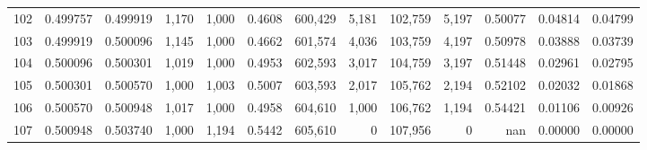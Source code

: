 \begin{tabular}{rrrrrrrrrrrrr}
102 &  0.499757 &  0.499919 &   1,170 &  1,000 &                                     0.4608 &  600,429 &    5,181 &  102,759 &    5,197 &  0.50077 &  0.04814 &  0.04799 \\
103 &  0.499919 &  0.500096 &   1,145 &  1,000 &                                     0.4662 &  601,574 &    4,036 &  103,759 &    4,197 &  0.50978 &  0.03888 &  0.03739 \\
104 &  0.500096 &  0.500301 &   1,019 &  1,000 &                                     0.4953 &  602,593 &    3,017 &  104,759 &    3,197 &  0.51448 &  0.02961 &  0.02795 \\
105 &  0.500301 &  0.500570 &   1,000 &  1,003 &                                     0.5007 &  603,593 &    2,017 &  105,762 &    2,194 &  0.52102 &  0.02032 &  0.01868 \\
106 &  0.500570 &  0.500948 &   1,017 &  1,000 &                                     0.4958 &  604,610 &    1,000 &  106,762 &    1,194 &  0.54421 &  0.01106 &  0.00926 \\
107 &  0.500948 &  0.503740 &   1,000 &  1,194 &                                     0.5442 &  605,610 &        0 &  107,956 &        0 &      nan &  0.00000 &  0.00000 \\
\bottomrule
\end{tabular}
